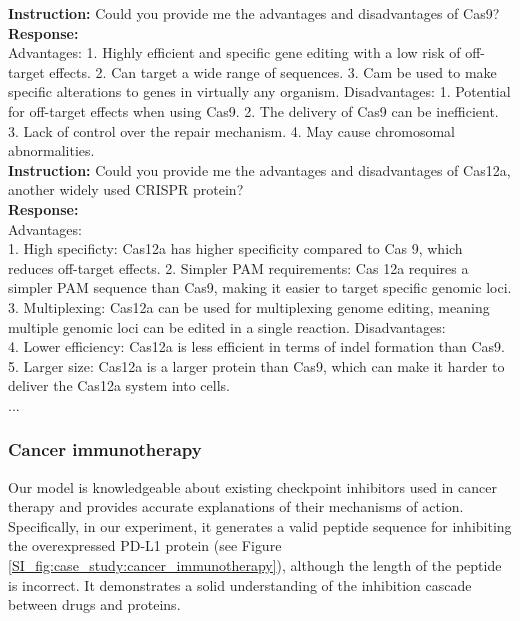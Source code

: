   
\begin{mdframed}[backgroundcolor=white, linecolor=black, linewidth=1pt]
    \noindent
    \textbf{Instruction:} Could you provide me the advantages and disadvantages of Cas9? \\
    \textbf{Response:} \\
    Advantages: 1. Highly efficient and specific gene editing with a low risk of off-target effects. 2. Can target a wide range of sequences.  3. Cam be used to make specific alterations to genes in virtually any organism.  Disadvantages: 1. Potential for off-target effects when using Cas9. 2. The delivery of Cas9 can be inefficient. 3. Lack of control over the repair mechanism. 4. May cause chromosomal abnormalities. \\

    \noindent
    \textbf{Instruction:} Could you provide me the advantages and disadvantages of Cas12a, another widely used CRISPR protein? \\
    \textbf{Response:} \\
    Advantages: \\
    1. High specificty: Cas12a has higher specificity compared to Cas 9, which reduces off-target effects. 
    2. Simpler PAM requirements: Cas 12a requires a simpler PAM sequence than Cas9, making it easier to target specific genomic loci. 
    3. Multiplexing: Cas12a can be used for multiplexing genome editing, meaning multiple genomic loci can be edited in a single reaction. 
    Disadvantages: \\
    4. Lower efficiency: Cas12a is less efficient in terms of indel formation than Cas9. 
    5. Larger size: Cas12a is a larger protein than Cas9, which can make it harder to deliver the Cas12a system into cells. \\
    ... 
\end{mdframed}  
 \label{fig:case_study:CRISPR}

\subsubsection{Cancer immunotherapy}
Our model is knowledgeable about existing checkpoint inhibitors used in cancer therapy and provides accurate explanations of their mechanisms of action. Specifically, in our experiment, it generates a valid peptide sequence for inhibiting the overexpressed PD-L1 protein (see Figure \ref{SI_fig:case_study:cancer_immunotherapy}), although the length of the peptide is incorrect. It demonstrates a solid understanding of the inhibition cascade between drugs and proteins.

